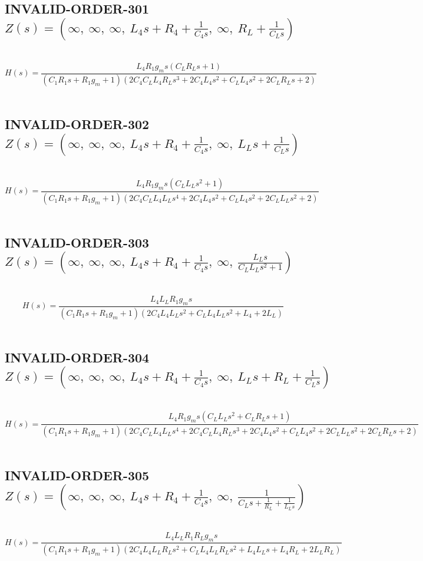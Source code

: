 \documentclass{article}
\begin{document}
\subsection{INVALID-ORDER-301 $Z(s) = \left( \infty, \  \infty, \  \infty, \  L_{4} s + R_{4} + \frac{1}{C_{4} s}, \  \infty, \  R_{L} + \frac{1}{C_{L} s}\right)$ } \ 
\textbf{\[H(s) = \frac{L_{4} R_{1} g_{m} s \left(C_{L} R_{L} s + 1\right)}{\left(C_{1} R_{1} s + R_{1} g_{m} + 1\right) \left(2 C_{4} C_{L} L_{4} R_{L} s^{3} + 2 C_{4} L_{4} s^{2} + C_{L} L_{4} s^{2} + 2 C_{L} R_{L} s + 2\right)}\] } \ 
\subsection{INVALID-ORDER-302 $Z(s) = \left( \infty, \  \infty, \  \infty, \  L_{4} s + R_{4} + \frac{1}{C_{4} s}, \  \infty, \  L_{L} s + \frac{1}{C_{L} s}\right)$ } \ 
\textbf{\[H(s) = \frac{L_{4} R_{1} g_{m} s \left(C_{L} L_{L} s^{2} + 1\right)}{\left(C_{1} R_{1} s + R_{1} g_{m} + 1\right) \left(2 C_{4} C_{L} L_{4} L_{L} s^{4} + 2 C_{4} L_{4} s^{2} + C_{L} L_{4} s^{2} + 2 C_{L} L_{L} s^{2} + 2\right)}\] } \ 
\subsection{INVALID-ORDER-303 $Z(s) = \left( \infty, \  \infty, \  \infty, \  L_{4} s + R_{4} + \frac{1}{C_{4} s}, \  \infty, \  \frac{L_{L} s}{C_{L} L_{L} s^{2} + 1}\right)$ } \ 
\textbf{\[H(s) = \frac{L_{4} L_{L} R_{1} g_{m} s}{\left(C_{1} R_{1} s + R_{1} g_{m} + 1\right) \left(2 C_{4} L_{4} L_{L} s^{2} + C_{L} L_{4} L_{L} s^{2} + L_{4} + 2 L_{L}\right)}\] } \ 
\subsection{INVALID-ORDER-304 $Z(s) = \left( \infty, \  \infty, \  \infty, \  L_{4} s + R_{4} + \frac{1}{C_{4} s}, \  \infty, \  L_{L} s + R_{L} + \frac{1}{C_{L} s}\right)$ } \ 
\textbf{\[H(s) = \frac{L_{4} R_{1} g_{m} s \left(C_{L} L_{L} s^{2} + C_{L} R_{L} s + 1\right)}{\left(C_{1} R_{1} s + R_{1} g_{m} + 1\right) \left(2 C_{4} C_{L} L_{4} L_{L} s^{4} + 2 C_{4} C_{L} L_{4} R_{L} s^{3} + 2 C_{4} L_{4} s^{2} + C_{L} L_{4} s^{2} + 2 C_{L} L_{L} s^{2} + 2 C_{L} R_{L} s + 2\right)}\] } \ 
\subsection{INVALID-ORDER-305 $Z(s) = \left( \infty, \  \infty, \  \infty, \  L_{4} s + R_{4} + \frac{1}{C_{4} s}, \  \infty, \  \frac{1}{C_{L} s + \frac{1}{R_{L}} + \frac{1}{L_{L} s}}\right)$ } \ 
\textbf{\[H(s) = \frac{L_{4} L_{L} R_{1} R_{L} g_{m} s}{\left(C_{1} R_{1} s + R_{1} g_{m} + 1\right) \left(2 C_{4} L_{4} L_{L} R_{L} s^{2} + C_{L} L_{4} L_{L} R_{L} s^{2} + L_{4} L_{L} s + L_{4} R_{L} + 2 L_{L} R_{L}\right)}\] } \ 
\end{document}
